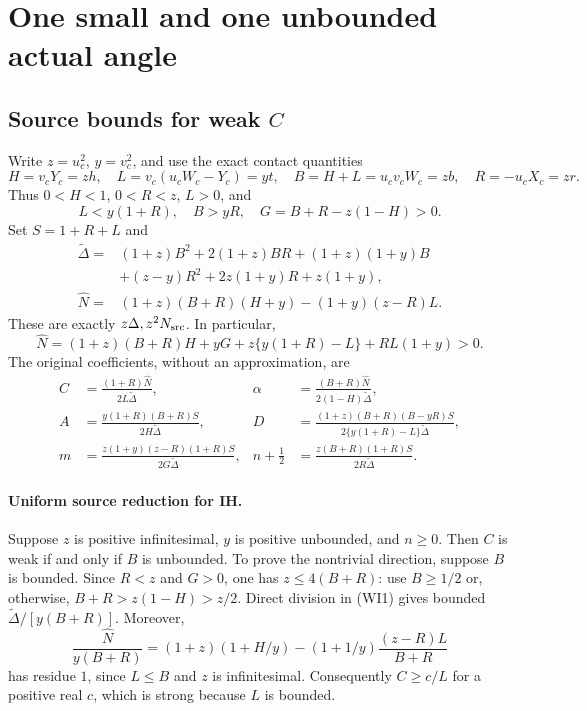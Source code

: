 \section{One small and one unbounded actual angle}
\subsection{Source bounds for weak $C$}
\label{component:p93b05ea6ad1e}

\label{p93b05ea6ad1e:sec:c2-weak-ih-frontier}

Write $z=u_c^2$, $y=v_c^2$, and use the exact contact quantities
\[
 H=v_cY_c=zh,\quad L=v_c(u_cW_c-Y_c)=yt,\quad
 B=H+L=u_cv_cW_c=zb,\quad R=-u_cX_c=zr.
\]
Thus $0<H<1$, $0<R<z$, $L>0$, and
\[
 L<y(1+R),\quad B>yR,\quad
 G=B+R-z(1-H)>0.
\]
Set $S=1+R+L$ and
\begin{align*}
 \widetilde\Delta={}&(1+z)B^2+2(1+z)BR+(1+z)(1+y)B\\
 &+(z-y)R^2+2z(1+y)R+z(1+y),\\
 \widehat N={}&(1+z)(B+R)(H+y)-(1+y)(z-R)L.
\end{align*}
These are exactly $z\Delta,z^2N_{\rm src}$. In particular,
\[
 \widehat N=(1+z)(B+R)H+yG+z\{y(1+R)-L\}+RL(1+y)>0.
\]
The original coefficients, without an approximation, are
\begin{align*}
 C&=\frac{(1+R)\widehat N}{2L\widetilde\Delta},&
 \alpha&=\frac{(B+R)\widehat N}{2(1-H)\widetilde\Delta},\\
 A&=\frac{y(1+R)(B+R)S}{2H\widetilde\Delta},&
 D&=\frac{(1+z)(B+R)(B-yR)S}
 {2\{y(1+R)-L\}\widetilde\Delta},\\
 m&=\frac{z(1+y)(z-R)(1+R)S}{2G\widetilde\Delta},&
 n+\frac12&=\frac{z(B+R)(1+R)S}{2R\widetilde\Delta}.
                                                        \tag{WI1}
\end{align*}

\paragraph{Uniform source reduction for IH.}
Suppose $z$ is positive infinitesimal, $y$ is positive unbounded,
and $n\ge0$. Then $C$ is weak if and only if $B$ is unbounded.
To prove the nontrivial direction, suppose $B$ is bounded. Since
$R<z$ and $G>0$, one has $z\le4(B+R)$: use $B\ge1/2$
or, otherwise, $B+R>z(1-H)>z/2$. Direct division in (WI1)
gives bounded $\widetilde\Delta/[y(B+R)]$. Moreover,
\[
 \frac{\widehat N}{y(B+R)}
 =(1+z)(1+H/y)
 -(1+1/y)\frac{(z-R)L}{B+R}
\]
has residue $1$, since $L\le B$ and $z$ is infinitesimal.
Consequently $C\ge c/L$ for a positive real $c$, which is strong
because $L$ is bounded.


